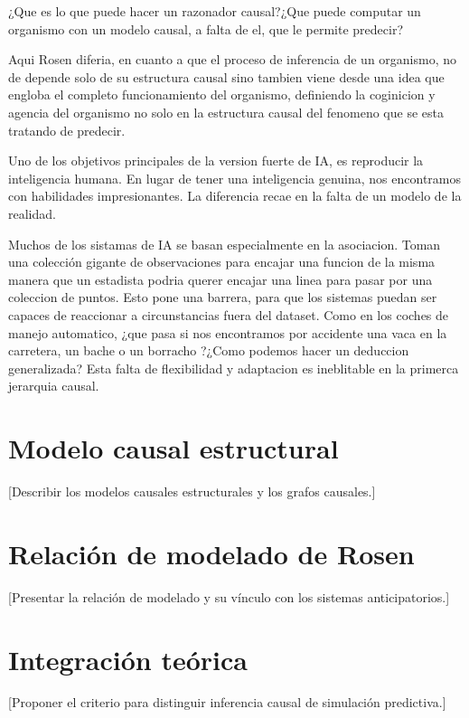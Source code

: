 ¿Que es lo que puede hacer un razonador causal?¿Que puede computar un organismo con un modelo causal, 
a falta de el, que le permite predecir? 

Aqui Rosen diferia, en cuanto a que el proceso de inferencia de un organismo, 
no de depende solo de su estructura causal sino tambien viene desde una idea que 
engloba el completo funcionamiento del organismo, definiendo la coginicion y agencia del 
organismo no solo en la estructura causal del fenomeno que se esta tratando de predecir. 

Uno de los objetivos principales de la version fuerte de IA, es reproducir la inteligencia humana. En lugar
de tener una inteligencia genuina, nos encontramos con habilidades impresionantes. La diferencia recae en la falta 
de un modelo de la realidad. 

Muchos de los sistamas de IA se basan especialmente en la asociacion. Toman una colección gigante de observaciones para 
encajar una funcion de la misma manera que un estadista podria querer encajar una linea para pasar por una 
coleccion de puntos. Esto pone una barrera, para que los sistemas puedan ser capaces de reaccionar a circunstancias fuera del 
dataset. Como en los coches de manejo automatico, ¿que pasa si nos encontramos por accidente una vaca en la carretera, un bache
o un borracho ?¿Como podemos hacer un deduccion generalizada? Esta falta de flexibilidad y adaptacion es ineblitable 
en la primerca jerarquia causal. 


\section{Modelo causal estructural}
[Describir los modelos causales estructurales y los grafos causales.]

\section{Relación de modelado de Rosen}
[Presentar la relación de modelado y su vínculo con los sistemas anticipatorios.]

\section{Integración teórica}
[Proponer el criterio para distinguir inferencia causal de simulación predictiva.]
